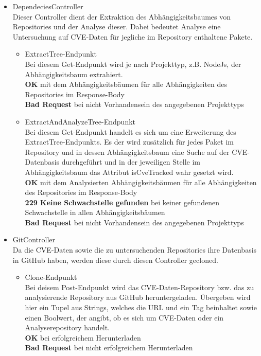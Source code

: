 \begin{itemize}
        \item DependeciesController \\
            Dieser Controller dient der Extraktion des Abhängigkeitsbaumes von Repositories und der Analyse dieser.
            Dabei bedeutet Analyse eine Untersuchung auf \ac{CVE}-Daten für jegliche im Repository enthaltene Pakete.
            \begin{itemize}
                \item ExtractTree-Endpunkt \\
                    Bei diesem Get-Endpunkt wird je nach Projekttyp, z.B. NodeJs, der Abhängigkeitsbaum extrahiert.
                    \\
                    \textbf{OK} mit dem Abhängigkeitsbäumen für alle Abhängigkeiten des Repositories im Response-Body
                    \\
                    \textbf{Bad Request} bei nicht Vorhandensein des angegebenen Projekttyps
                \item ExtractAndAnalyzeTree-Endpunkt \\
                    Bei diesem Get-Endpunkt handelt es sich um eine Erweiterung des ExtractTree-Endpunkts.
                    Es der wird zusätzlich für jedes Paket im Repository und in dessen Abhängigkeitsbaum eine Suche auf der CVE-Datenbasis durchgeführt und in der jeweiligen Stelle im Abhängigkeitsbaum das Attribut isCveTracked wahr gesetzt wird.
                    \\
                    \textbf{OK} mit dem Analysierten Abhängigkeitsbäumen für alle Abhängigkeiten des Repositories im Response-Body
                    \\
                    \textbf{229 Keine Schwachstelle gefunden} bei keiner gefundenen Schwachstelle in allen Abhängigkeitsbäumen
                    \\
                    \textbf{Bad Request} bei nicht Vorhandensein des angegebenen Projekttyps
            \end{itemize}

        \item GitController \\
            Da die \ac{CVE}-Daten sowie die zu untersuchenden Repositories ihre Datenbasis in GitHub\cite{GITHUB} haben, werden diese durch diesen Controller gecloned.
            \begin{itemize}
                \item Clone-Endpunkt \\
                    Bei deisem Post-Endpunkt wird das CVE-Daten-Repository bzw. das zu analysierende Repository aus GitHub heruntergeladen.
                    Übergeben wird hier ein Tupel aus Strings, welches die URL und ein Tag beinhaltet sowie einen Boolwert, der angibt, ob es sich um CVE-Daten oder ein Analyserepository handelt.
                    \\
                    \textbf{OK} bei erfolgreichem Herunterladen
                    \\
                    \textbf{Bad Request} bei nicht erfolgreichem Herunterladen
            \end{itemize}


\end{itemize}
